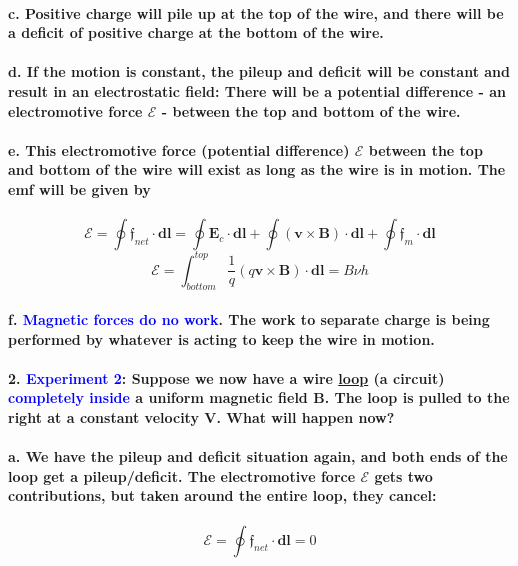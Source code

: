 \documentclass{article}
\begin{document}
\paragraph{\indent c. Positive charge will pile up at the top of the wire, and there will be a deficit of positive charge at the bottom of the wire.}
\paragraph{\indent d. If the motion is constant, the pileup and deficit will be constant and result in an electrostatic field: There will be a potential difference - an electromotive force $\mathcal{E}$ - between the top and bottom of the wire.}
\paragraph{\indent e. This electromotive force (potential difference) $\mathcal{E}$ between the top and bottom of the wire will exist as long as the wire is in motion. The emf will be given by}
\begin{equation*}
    \mathcal{E}=\oint\boldsymbol{\mathfrak{f}}_{net}\cdot\boldsymbol{dl}=\oint\boldsymbol{E}_c\cdot\boldsymbol{dl}+\oint(\boldsymbol{v}\times\boldsymbol{B})\cdot\boldsymbol{dl}+\oint\boldsymbol{\mathfrak{f}}_m\cdot\boldsymbol{dl}
\end{equation*}
\begin{equation*}
    \mathcal{E}=\int_{bottom}^{top}\frac{1}{q}(q\boldsymbol{v}\times\boldsymbol{B})\cdot\boldsymbol{dl}=B\nu h
\end{equation*}
\paragraph{\indent f. \textcolor{blue}{Magnetic forces do no work}. The work to separate charge is being performed by whatever is acting to keep the wire in motion.}
\paragraph{2. \textcolor{blue}{Experiment 2}: Suppose we now have a wire \underline{loop} (a circuit) \textcolor{blue}{completely inside} a uniform magnetic field $\boldsymbol{B}$. The loop is pulled to the right at a constant velocity $\boldsymbol{V}$. What will happen now?}
\paragraph{\indent a. We have the pileup and deficit situation again, and both ends of the loop get a pileup/deficit. The electromotive force $\mathcal{E}$ gets two contributions, but taken around the entire loop, they cancel:}
\begin{equation*}
    \mathcal{E}=\oint\boldsymbol{\mathfrak{f}}_{net}\cdot\boldsymbol{dl}=0
\end{equation*}
\end{document}
